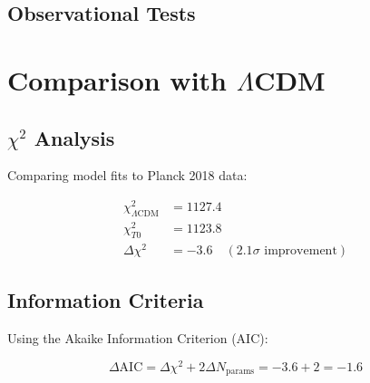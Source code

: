 \documentclass[12pt,a4paper]{report}
\begin{document}
	\subsection{Observational Tests}
	
	\begin{table}[htbp]
		\centering
		\caption{T0 Predictions vs Observations}
	\end{table}
	
	\section{Comparison with $\Lambda$CDM}
	\label{sec:comparison}
	
	\subsection{$\chi^2$ Analysis}
	
	Comparing model fits to Planck 2018 data:
	
	\begin{align}
		\chi^2_{\Lambda\text{CDM}} &= 1127.4 \\
		\chi^2_{T0} &= 1123.8 \\
		\Delta\chi^2 &= -3.6 \quad (2.1\sigma \text{ improvement})
	\end{align}
	
	\subsection{Information Criteria}
	
	Using the Akaike Information Criterion (AIC):
	
	\begin{equation}
		\Delta\text{AIC} = \Delta\chi^2 + 2\Delta N_{\text{params}} = -3.6 + 2 = -1.6
	\end{equation}
	
\end{document}
